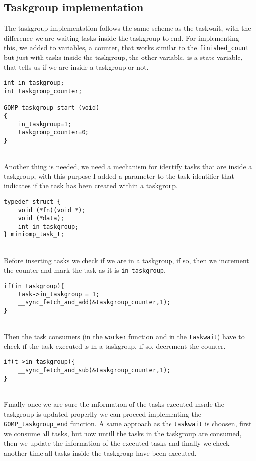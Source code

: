 \subsection{Taskgroup implementation}
The taskgroup implementation follows the same scheme as the taskwait, with the difference we are waiting tasks inside the taskgroup to end. For implementing this, we added to variables, a counter, that works similar to the \texttt{finished\_count} but just with tasks inside the taskgroup, the other variable, is a state variable, that tells us if we are inside a taskgroup or not.

\begin{lstlisting}[caption=Control variables and taskgroup start,label=tgstart]
int in_taskgroup;
int taskgroup_counter;

GOMP_taskgroup_start (void)
{
    in_taskgroup=1;
    taskgroup_counter=0;
}
\end{lstlisting}
\par ~\\ 
Another thing is needed, we need a mechanism for identify tasks that are inside a taskgroup, with this purpose I added a parameter to the task identifier that indicates if the task has been created within a taskgroup.
\begin{lstlisting}[caption=Task structure definition,label=caption]
typedef struct {
    void (*fn)(void *);
    void (*data);
    int in_taskgroup;
} miniomp_task_t;
\end{lstlisting}
\par ~\\
Before inserting tasks we check if we are in a taskgroup, if so, then we increment the counter and mark the task as it is \texttt{in\_taskgroup}.
\begin{lstlisting}[caption=Taskgroup aware task producer,label=tgproducer]
if(in_taskgroup){
    task->in_taskgroup = 1;
    __sync_fetch_and_add(&taskgroup_counter,1);
}
\end{lstlisting}
\par ~\\
Then the task consumers (in the \texttt{worker} function and in the \texttt{taskwait}) have to check if the task executed is in a taskgroup, if so, decrement the counter.
\begin{lstlisting}[caption=Taskgroup aware task consumer,label=tgconsumer]
if(t->in_taskgroup){
    __sync_fetch_and_sub(&taskgroup_counter,1);
}
\end{lstlisting}

\par ~\\
Finally once we are sure the information of the tasks executed inside the taskgroup is updated properlly we can proceed implementing the \texttt{GOMP\_taskgroup\_end} function. A same approach as the \texttt{taskwait} is choosen, first we consume all tasks, but now untill the tasks in the taskgroup are consumed, then we update the information of the executed tasks and finally we check another time all tasks inside the taskgroup have been executed.

